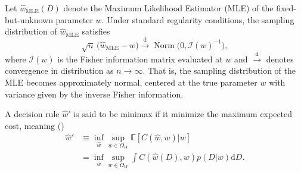 \begin{theorem}
	\label{thm:unbiased_mle}
	Let $\hat{w}_{\mathrm{MLE}}(D)$ denote the Maximum Likelihood Estimator (MLE) of the fixed-but-unknown parameter $w$. Under standard regularity conditions, the sampling distribution of $\hat{w}_{\mathrm{MLE}}$ satisfies
	\begin{equation}
		\sqrt{n}\,\big(\hat{w}_{\mathrm{MLE}} - w\big) \xrightarrow{\text{d}} \operatorname{Norm}\big(0, \mathcal{I}(w)^{-1}\big),
	\end{equation}
	where $\mathcal{I}(w)$ is the Fisher information matrix evaluated at $w$ and $\xrightarrow{\text{d}}$ denotes convergence in distribution as $n \to \infty$. 
	That is, the sampling distribution of the MLE becomes approximately normal, centered at the true parameter $w$ with variance given by the inverse Fisher information.
\end{theorem}


\begin{definition}
	\label{def:minimax}
	A decision rule $\hat{w}'$ is said to be minimax if it minimize the maximum expected cost, meaning ()
	\begin{equation}
		\begin{split}
			\hat{w}' &\equiv \inf_{\hat{w}}\sup_{w\in \Omega_W}\mathbb{E}[C(\hat{w},w)|w]\\
			& = \inf_{\hat{w}}\sup_{w\in \Omega_W}\int  C(\hat{w}(D),w) p(D|w) \mathrm{d}D.
		\end{split}
	\end{equation}
\end{definition}


